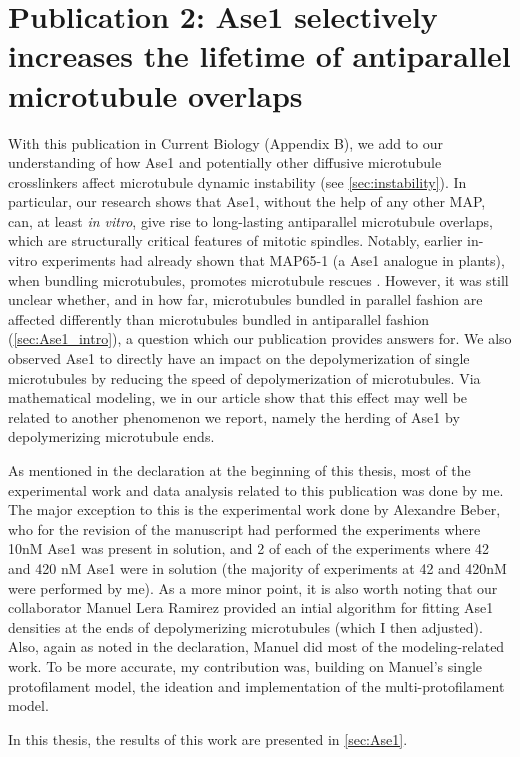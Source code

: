 \section{Publication 2: Ase1 selectively increases the lifetime of antiparallel microtubule overlaps}
With this publication in Current Biology \parencite{Krattenmacher2024} (Appendix B), we add to our understanding of how Ase1 and potentially other diffusive microtubule crosslinkers affect microtubule dynamic instability (see \autoref{sec:instability}). In particular, our research shows that Ase1, without the help of any other MAP, can, at least \textit{in vitro}, give rise to long-lasting antiparallel microtubule overlaps, which are structurally critical features of mitotic spindles. Notably, earlier in-vitro experiments had already shown that MAP65-1 (a Ase1 analogue in plants), when bundling microtubules, promotes microtubule rescues \parencite{Stoppin-Mellet2013}. However, it was still unclear whether, and in how far, microtubules bundled in parallel fashion are affected differently than microtubules bundled in antiparallel fashion (\autoref{sec:Ase1_intro}), a question which our publication provides answers for. We also observed Ase1 to directly have an impact on the depolymerization of single microtubules by reducing the speed of depolymerization of microtubules. Via mathematical modeling, we in our article show that this effect may well be related to another phenomenon we report, namely the herding of Ase1 by depolymerizing microtubule ends. \par

As mentioned in the declaration at the beginning of this thesis, most of the experimental work and data analysis related to this publication was done by me. The major exception to this is the experimental work done by Alexandre Beber, who for the revision of the manuscript had performed the experiments where 10nM Ase1 was present in solution, and 2 of each of the experiments where 42 and 420 nM Ase1 were in solution (the majority of experiments at 42 and 420nM were performed by me). As a more minor point, it is also worth noting that our collaborator Manuel Lera Ramirez provided an intial algorithm for fitting Ase1 densities at the ends of depolymerizing microtubules (which I then adjusted). Also, again as noted in the declaration, Manuel did most of the modeling-related work. To be more accurate, my contribution was, building on Manuel's single protofilament model, the ideation and implementation of the multi-protofilament model.\par

In this thesis, the results of this work are presented in \autoref{sec:Ase1}.